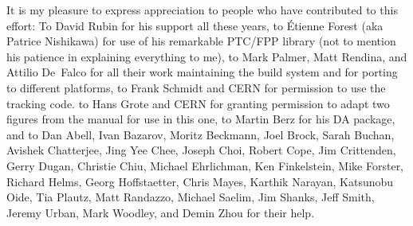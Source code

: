 It is my pleasure to express appreciation to people who have
contributed to this effort: To David Rubin for his support all these
years, to \'Etienne Forest (aka Patrice Nishikawa) for use of his
remarkable PTC/FPP library (not to mention his patience in explaining
everything to me), to Mark Palmer, Matt Rendina, and Attilio De~Falco
for all their work maintaining the build system and for porting \bmad
to different platforms, to Frank Schmidt and CERN for permission to
use the \mad tracking code. to Hans Grote and CERN for granting
permission to adapt two figures from the \mad manual for use in this
one, to Martin Berz for his DA package, and to Dan Abell, Ivan
Bazarov, Moritz Beckmann, Joel Brock, Sarah Buchan, Avishek
Chatterjee, Jing Yee Chee, Joseph Choi, Robert Cope, Jim Crittenden,
Gerry Dugan, Christie Chiu, Michael Ehrlichman, Ken Finkelstein, Mike
Forster, Richard Helms, Georg Hoffstaetter, Chris Mayes, Karthik
Narayan, Katsunobu Oide, Tia Plautz, Matt Randazzo, Michael Saelim,
Jim Shanks, Jeff Smith, Jeremy Urban, Mark Woodley, and Demin Zhou for
their help.


